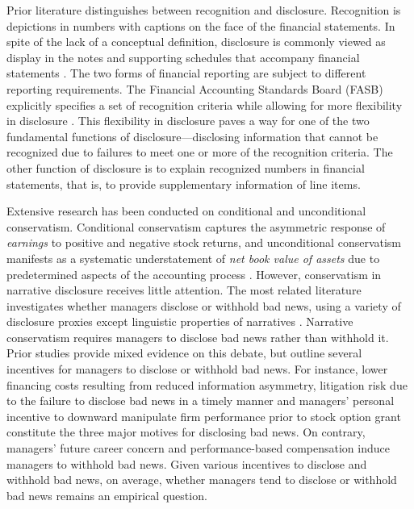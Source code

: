 \documentclass[a4paper]{article}
\begin{document}
\begin{spacing}{2}
Prior literature distinguishes between recognition and disclosure. Recognition is depictions in numbers with captions on the face of the financial statements. In spite of the lack of a conceptual definition, disclosure is commonly viewed as display in the notes and supporting schedules that accompany financial statements \citep*{schipperRequiredDisclosuresFinancial2007}. The two forms of financial reporting are subject to different reporting requirements. The Financial Accounting Standards Board (FASB) explicitly specifies a set of recognition criteria while allowing for more flexibility in disclosure \citep*{fasbStatementFinancialAccounting1984}. This flexibility in disclosure paves a way for one of the two fundamental functions of disclosure---disclosing information that cannot be recognized due to failures to meet one or more of the recognition criteria. The other function of disclosure is to explain recognized numbers in financial statements, that is, to provide supplementary information of line items. 

Extensive research has been conducted on conditional and unconditional conservatism. Conditional conservatism captures the asymmetric response of \textit{earnings} to positive and negative stock returns, and unconditional conservatism manifests as a systematic understatement of \textit{net book value of assets} due to predetermined aspects of the accounting process \citep[e.g.,][]{beaverConditionalUnconditionalConservatism2005}. However, conservatism in narrative disclosure receives little attention. The most related literature investigates whether managers disclose or withhold bad news, using a variety of disclosure proxies except linguistic properties of narratives \citep*{baoManagersDiscloseWithhold2019, kothariManagersWithholdBad2009, skinnerWhyFirmsVoluntarily1994, skinnerEarningsDisclosuresStockholder1997}. Narrative conservatism requires managers to disclose bad news rather than withhold it. Prior studies provide mixed evidence on this debate, but outline several incentives for managers to disclose or withhold bad news. For instance, lower financing costs resulting from reduced information asymmetry, litigation risk due to the failure to disclose bad news in a timely manner and managers' personal incentive to downward manipulate firm performance prior to stock option grant constitute the three major motives for disclosing bad news. On contrary, managers' future career concern and performance-based compensation induce managers to withhold bad news. Given various incentives to disclose and withhold bad news, on average, whether managers tend to disclose or withhold bad news remains an empirical question.


\end{spacing}
\end{document}
